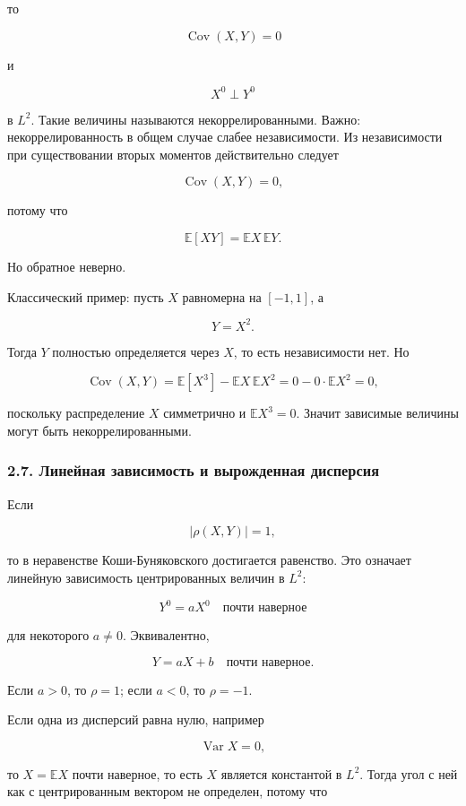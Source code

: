 \documentclass[
  11pt,
  a4paper,
]{article}
\begin{document}
то

\[
\operatorname{Cov}(X,Y)=0
\]

и

\[
X^0\perp Y^0
\]

в \(L^2\). Такие величины называются некоррелированными. Важно:
некоррелированность в общем случае слабее независимости. Из
независимости при существовании вторых моментов действительно следует

\[
\operatorname{Cov}(X,Y)=0,
\]

потому что

\[
\mathbb E[XY]=\mathbb EX\,\mathbb EY.
\]

Но обратное неверно.

Классический пример: пусть \(X\) равномерна на \([-1,1]\), а

\[
Y=X^2.
\]

Тогда \(Y\) полностью определяется через \(X\), то есть независимости
нет. Но

\[
\operatorname{Cov}(X,Y)
=
\mathbb E[X^3]-\mathbb EX\,\mathbb EX^2
=
0-0\cdot\mathbb EX^2
=0,
\]

поскольку распределение \(X\) симметрично и \(\mathbb E X^3=0\). Значит
зависимые величины могут быть некоррелированными.

\subsubsection{2.7. Линейная зависимость и вырожденная
дисперсия}\label{ux43bux438ux43dux435ux439ux43dux430ux44f-ux437ux430ux432ux438ux441ux438ux43cux43eux441ux442ux44c-ux438-ux432ux44bux440ux43eux436ux434ux435ux43dux43dux430ux44f-ux434ux438ux441ux43fux435ux440ux441ux438ux44f}

Если

\[
|\rho(X,Y)|=1,
\]

то в неравенстве Коши-Буняковского достигается равенство. Это означает
линейную зависимость центрированных величин в \(L^2\):

\[
Y^0=aX^0
\quad\text{почти наверное}
\]

для некоторого \(a\ne0\). Эквивалентно,

\[
Y=aX+b
\quad\text{почти наверное}.
\]

Если \(a>0\), то \(\rho=1\); если \(a<0\), то \(\rho=-1\).

Если одна из дисперсий равна нулю, например

\[
\operatorname{Var}X=0,
\]

то \(X=\mathbb EX\) почти наверное, то есть \(X\) является константой в
\(L^2\). Тогда угол с ней как с центрированным вектором не определен,
потому что
\end{document}
